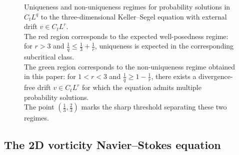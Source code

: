 \documentclass[UTF-8,reqno]{amsart}
\numberwithin{equation}{section}
\theoremstyle{definition}
\def\geq{\geqslant}
\def\leq{\leqslant}
\def\geq{\geqslant}
\def\leq{\leqslant}
\begin{document}
\begin{figure}
    \centering
   
\caption{
Uniqueness and non-uniqueness regimes for probability solutions in
$C_tL^q$ to the three-dimensional Keller--Segel equation with external drift
$v\in C_tL^r$. \\
The red region corresponds to the expected well-posedness regime: for $r>3$
and $\frac1q\leq \frac13+\frac1r$, uniqueness is expected in the corresponding
subcritical class.  \\
The green region corresponds to the non-uniqueness regime
obtained in this paper: for $1<r<3$ and
$\frac1q\geq 1-\frac1r$, there exists a divergence-free drift
$v\in C_tL^r$ for which the equation admits multiple probability solutions.\\
The point $(\frac13,\frac23)$ marks the sharp threshold separating these
two regimes.
}
\label{tu:sde}
\end{figure}

 \subsection{The 2D vorticity Navier--Stokes equation}
\end{document}
